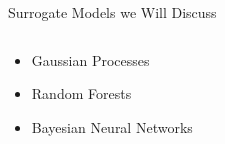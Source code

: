 \begin{frame}[c]{Surrogate Models we Will Discuss}

\begin{columns}[T] %
\begin{column}{.48\textwidth}
\begin{itemize}
	\item<1-3> Gaussian Processes 
	\item<2-3> Random Forests 
	\item<3-3> Bayesian Neural Networks 
\end{itemize}
\end{column}%

\hfill%


\end{columns}
\end{frame}
